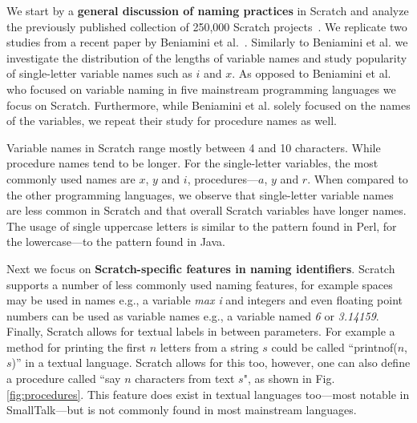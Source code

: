 \documentclass[conference]{IEEEtran}
\newcommand{\todo}[1]{ \textbf{#1} }
\begin{document}
We start by a \textbf{general discussion of naming practices} in Scratch and analyze the previously published collection of 250,000 Scratch projects~\cite{Aivaloglou2016HowKC}. 
We replicate two studies from a recent paper by Beniamini et al.~\cite{Beniamini}.
Similarly to Beniamini et al. we investigate the distribution of the lengths of variable names and study popularity of single-letter variable names such as $i$ and $x$.
As opposed to Beniamini et al. who focused on variable naming in five mainstream programming languages we focus on Scratch.
Furthermore, while Beniamini et al. solely focused on the names of the variables, we repeat their study for procedure names as well.

\begin{framed}
Variable names in Scratch range mostly between 4 and 10 characters. While procedure names tend to be longer. 
For the single-letter variables, the most commonly used names are $x$, $y$ and $i$, procedures---$a$, $y$ and $r$. 
When compared to the other programming languages, we observe that single-letter variable names are less common in Scratch and that overall Scratch variables have longer names. 
The usage of single uppercase letters is similar to the pattern found in Perl, for the lowercase---to the pattern found in Java.
\end{framed}



Next we focus on \textbf{Scratch-specific features in naming identifiers}. Scratch supports a number of less commonly used naming features, for example spaces may be used in names e.g., a variable \emph{max i} and integers and even floating point numbers can be used as variable names e.g., a variable named \emph{6} or \emph{3.14159}. Finally, Scratch allows for textual labels in between parameters. For example a method for printing the first $n$ letters from a string $s$ could be called ``printnof($n$,$s$)'' in a textual language. Scratch allows for this too, however, one can also define a procedure called ``say $n$ characters from text $s$", as shown in Fig. \ref{fig:procedures}. 
This feature does exist in textual languages too---most notable in SmallTalk---but is not commonly found in most mainstream languages. 
\end{document}
